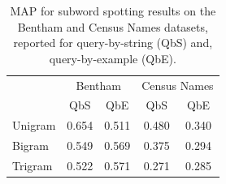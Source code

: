 \documentclass[ms,electronic,twosidetoc,letterpaper,chaptercenter,parttop,lol,lof,lot]{byumsphd}
\begin{document}
\begin{table}
\centering
\begin{tabular}{| l | c c | c c |}
  \hline
   & \multicolumn{2}{c|}{Bentham} & \multicolumn{2}{c|}{Census Names}\\
   & QbS  & QbE    &  QbS &  QbE    \\
 
  \hline %
  Unigram &  0.654 &  0.511  & 0.480 &  0.340 \\
  Bigram  &  0.549 &  0.569  & 0.375 &  0.294 \\
  Trigram &  0.522 &  0.571  & 0.271 &  0.285 \\
  \hline 
\end{tabular}
\caption{MAP for subword spotting results on the Bentham and Census Names datasets, reported for query-by-string (QbS) and, query-by-example (QbE).}
\label{tab:subwordspotting}
\end{table}
\end{document}
